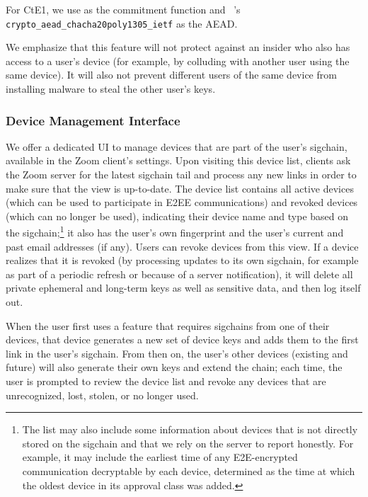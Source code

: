 For \textsf{CtE1}, we use \HMACSHATWO as the commitment function and
\sodium{}~\cite{libsodium}'s \linebreak \texttt{crypto\_aead\_chacha20poly1305\_ietf} as the AEAD.

We emphasize that this feature will not protect against an insider who also has access to a user's
device (for example, by colluding with another user using the same device). It will also not prevent
different users of the same device from installing malware to steal the other user's keys.

\subsubsection{Device Management Interface}

We offer a dedicated UI to manage devices that are part of the user's sigchain, available in the
Zoom client's settings. Upon visiting this device list, clients ask the Zoom server for the latest
sigchain tail and process any new links in order to make sure that the view is up-to-date. The
device list contains all active devices (which can be used to participate in E2EE communications)
and revoked devices (which can no longer be used), indicating their device name and type based on
the sigchain;\footnote{The list may also include some information about devices that is not directly
stored on the sigchain and that we rely on the server to report honestly. For example, it may
include the earliest time of any E2E-encrypted communication decryptable by each device, determined
as the time at which the oldest device in its approval class was added.} it also has the user's own
fingerprint and the user's current and past email addresses (if any). Users can revoke devices from
this view. If a device realizes that it is revoked (by processing updates to its own sigchain, for
example as part of a periodic refresh or because of a server notification), it will delete all
private ephemeral and long-term keys as well as sensitive data, and then log itself out.

When the user first uses a feature that requires sigchains from one of their devices, that device
generates a new set of device keys and adds them to the first link in the user's sigchain. From then
on, the user's other devices (existing and future) will also generate their own keys and extend the
chain; each time, the user is prompted to review the device list and revoke any devices that are
unrecognized, lost, stolen, or no longer used.

